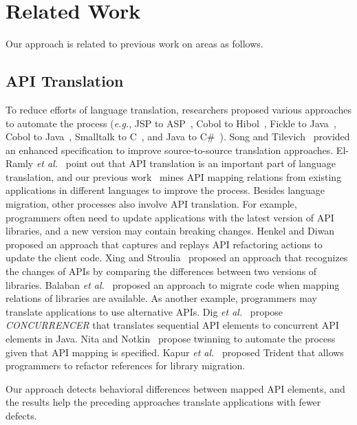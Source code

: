 \section{Related Work}
\label{sec:related}

Our approach is related to previous work on areas as follows.

\subsection{API Translation} To reduce efforts of language translation, researchers proposed various
approaches to automate the process (\emph{e.g.}, JSP to ASP~\citep{hassan2005lightweight}, Cobol to Hibol~\citep{waters1988program}, Fickle to Java~\citep{ancona2007provenly}, Cobol to Java~\citep{mossienko2003automated}, Smalltalk to C~\citep{yasumatsu1995spice}, and Java to C\#~\citep{el2006experiment}). Song and Tilevich~\citep{song2009enhancing} provided an enhanced specification to improve source-to-source translation approaches. El-Ramly \emph{et al.}~\citep{el2006experiment} point out that API translation is an important part of language translation, and our previous work~\citep{zhong2010mining} mines API mapping relations from existing applications in different languages to improve the process. Besides language migration, other processes also involve API translation. For example, programmers often need to update applications with the latest version of API libraries, and a new version may contain breaking changes. Henkel and Diwan~\citep{henkel2005catchup} proposed an approach that captures and replays API refactoring actions to update the client code. Xing and Stroulia~\citep{xing2007api} proposed an approach that recognizes the changes of APIs by comparing the differences between two versions of libraries. Balaban \emph{et al.}~\citep{balaban2005refactoring} proposed an approach to migrate code when mapping relations of libraries are available. As another example, programmers may translate applications to use alternative APIs. Dig \emph{et al.}~\citep{dig2009refactoring} propose \emph{CONCURRENCER} that translates sequential API elements to concurrent API elements in Java. Nita and Notkin~\citep{nita2010using} propose twinning to automate the process given that API mapping is specified. Kapur \emph{et al.}~\citep{kapur2010refactoring} proposed Trident that allows programmers to refactor references for library migration. 

Our approach detects behavioral differences between mapped API elements, and the results help the preceding approaches translate applications with fewer defects.

